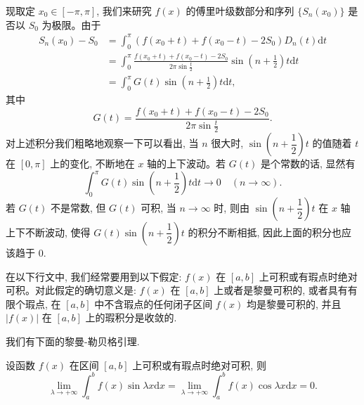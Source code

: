 现取定 $x_0\in[-\pi,\pi]$, 我们来研究 $f(x)$ 的傅里叶级数部分和序列 $\{S_n(x_0)\}$ 是否以 $S_0$ 为极限。由于
\[
\begin{aligned}
  S_n(x_0)-S_0
  &=\int_0^\pi (f(x_0+t)+f(x_0-t)-2S_0)D_n(t)\mathrm dt\\
  &=\int_0^\pi\frac{f(x_0+t)+f(x_0-t)-2S_0}{2\pi\sin\frac t2}
    \sin\left(n+\frac12\right)t\mathrm dt\\
  &=\int_0^\pi G(t)\sin\left(n+\frac12\right)t\mathrm dt,
\end{aligned}
\]
其中
\begin{equation}
  G(t)=\frac{f(x_0+t)+f(x_0-t)-2S_0}{2\pi\sin\frac t2}.
  \label{eq:ma-12-2-1}
\end{equation}
对上述积分我们粗略地观察一下可以看出, 当 $n$ 很大时, $\sin\left(n+\dfrac12\right)t$ 的值随着 $t$ 在 $[0,\pi]$ 上的变化, 不断地在 $x$ 轴的上下波动。若 $G(t)$ 是个常数的话, 显然有
\[
  \int_0^\pi G(t)\sin\left(n+\frac12\right)t\mathrm dt\to0
  \quad (n\to\infty).
\]
若 $G(t)$ 不是常数, 但 $G(t)$ 可积, 当 $n\to\infty$ 时, 则由 $\sin\left(n+\dfrac12\right)t$ 在 $x$ 轴上下不断波动, 使得 $G(t)\sin\left(n+\dfrac12\right)t$ 的积分不断相抵, 因此上面的积分也应该趋于 $0$.

在以下行文中, 我们经常要用到以下假定: $f(x)$ 在 $[a,b]$ 上可积或有瑕点时绝对可积。对此假定的确切意义是: $f(x)$ 在 $[a,b]$ 上或者是黎曼可积的, 或者具有有限个瑕点, 在 $[a,b]$ 中不含瑕点的任何闭子区间 $f(x)$ 均是黎曼可积的, 并且 $|f(x)|$ 在 $[a,b]$ 上的瑕积分是收敛的.

我们有下面的黎曼-勒贝格引理.

\begin{lemma}[{黎曼-勒贝格引理}]\label{lemma:ma-12-2-1}
设函数 $f(x)$ 在区间 $[a,b]$ 上可积或有瑕点时绝对可积, 则
\[
  \lim_{\lambda\to+\infty}\int_a^b f(x)\sin\lambda x\mathrm dx
  =\lim_{\lambda\to+\infty}\int_a^b f(x)\cos\lambda x\mathrm dx=0.
\]
\end{lemma}


